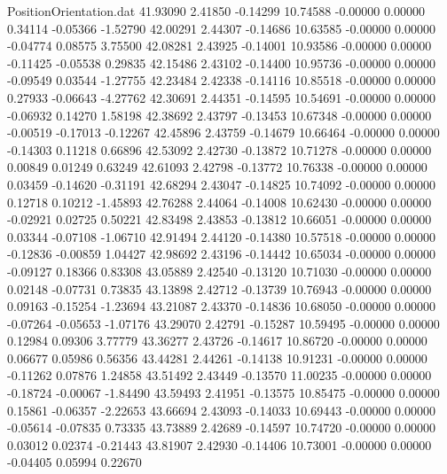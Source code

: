 \begin{filecontents}{PositionOrientation.dat}
  41.93090    2.41850   -0.14299    10.74588   -0.00000    0.00000    0.34114   -0.05366   -1.52790
  42.00291    2.44307   -0.14686    10.63585   -0.00000    0.00000   -0.04774    0.08575    3.75500
  42.08281    2.43925   -0.14001    10.93586   -0.00000    0.00000   -0.11425   -0.05538    0.29835
  42.15486    2.43102   -0.14400    10.95736   -0.00000    0.00000   -0.09549    0.03544   -1.27755
  42.23484    2.42338   -0.14116    10.85518   -0.00000    0.00000    0.27933   -0.06643   -4.27762
  42.30691    2.44351   -0.14595    10.54691   -0.00000    0.00000   -0.06932    0.14270    1.58198
  42.38692    2.43797   -0.13453    10.67348   -0.00000    0.00000   -0.00519   -0.17013   -0.12267
  42.45896    2.43759   -0.14679    10.66464   -0.00000    0.00000   -0.14303    0.11218    0.66896
  42.53092    2.42730   -0.13872    10.71278   -0.00000    0.00000    0.00849    0.01249    0.63249
  42.61093    2.42798   -0.13772    10.76338   -0.00000    0.00000    0.03459   -0.14620   -0.31191
  42.68294    2.43047   -0.14825    10.74092   -0.00000    0.00000    0.12718    0.10212   -1.45893
  42.76288    2.44064   -0.14008    10.62430   -0.00000    0.00000   -0.02921    0.02725    0.50221
  42.83498    2.43853   -0.13812    10.66051   -0.00000    0.00000    0.03344   -0.07108   -1.06710
  42.91494    2.44120   -0.14380    10.57518   -0.00000    0.00000   -0.12836   -0.00859    1.04427
  42.98692    2.43196   -0.14442    10.65034   -0.00000    0.00000   -0.09127    0.18366    0.83308
  43.05889    2.42540   -0.13120    10.71030   -0.00000    0.00000    0.02148   -0.07731    0.73835
  43.13898    2.42712   -0.13739    10.76943   -0.00000    0.00000    0.09163   -0.15254   -1.23694
  43.21087    2.43370   -0.14836    10.68050   -0.00000    0.00000   -0.07264   -0.05653   -1.07176
  43.29070    2.42791   -0.15287    10.59495   -0.00000    0.00000    0.12984    0.09306    3.77779
  43.36277    2.43726   -0.14617    10.86720   -0.00000    0.00000    0.06677    0.05986    0.56356
  43.44281    2.44261   -0.14138    10.91231   -0.00000    0.00000   -0.11262    0.07876    1.24858
  43.51492    2.43449   -0.13570    11.00235   -0.00000    0.00000   -0.18724   -0.00067   -1.84490
  43.59493    2.41951   -0.13575    10.85475   -0.00000    0.00000    0.15861   -0.06357   -2.22653
  43.66694    2.43093   -0.14033    10.69443   -0.00000    0.00000   -0.05614   -0.07835    0.73335
  43.73889    2.42689   -0.14597    10.74720   -0.00000    0.00000    0.03012    0.02374   -0.21443
  43.81907    2.42930   -0.14406    10.73001   -0.00000    0.00000   -0.04405    0.05994    0.22670

\end{filecontents}
